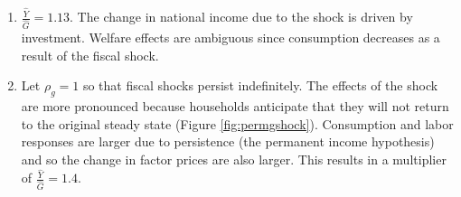 \documentclass[11pt]{article}
\begin{document}
\begin{enumerate}
        \item $\frac{\hat Y}{\hat G} = 1.13$. The change in national income due to the shock is driven by investment. Welfare effects are ambiguous since consumption decreases as a result of the fiscal shock.

        \item Let $\rho_g = 1$ so that fiscal shocks persist indefinitely. The effects of the shock are more pronounced because households anticipate that they will not return to the original steady state (Figure \ref{fig:permgshock}). Consumption and labor responses are larger due to persistence (the permanent income hypothesis) and so the change in factor prices are also larger. This results in a multiplier of $\frac{\hat Y}{\hat G} = 1.4$.

    \end{enumerate}

\clearpage

%
%
%
%     
%
%
%
%     
\end{document}
